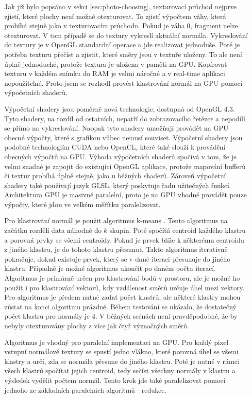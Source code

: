 \documentclass[11pt,twoside,a4paper]{book}
\begin{document}
Jak již bylo popsáno v sekci \ref{sec:photo-choosing}, texturovací průchod nejprve zjistí, které plochy není možné otexturovat. To zjistí výpočtem váhy, která probíhá stejně jako v texturovacím průchodu. Pokud je váha 0, fragment nelze otexturovat. V tom případě se do textury vykreslí aktuální normála. Vykreslování do textury je v OpenGL standardní operace a jde realizovat jednoduše. Poté je potřeba texturu přečíst a zjistit, které směry jsou v textuře uloženy. To ale není úplně jednoduché, protože textura je uložena v paměti na GPU. Kopírovat texturu v každém snímku do RAM je velmi náročné a v real-time aplikaci nepoužitelné. Proto jsem se rozhodl provést klastrování normál na GPU pomocí výpočetních shaderů.

Výpočetní shadery jsou poměrně nová technologie, dostupná od OpenGL 4.3. Tyto shadery, na rozdíl od ostatních, nepatří do zobrazovacího řetězce a nepodílí se přímo na vykreslování. Naopak tyto shadery umožňují provádět na GPU obecné výpočty, které s grafikou vůbec nemusí souviset. Výpočetní shadery jsou podobné technologiím CUDA nebo OpenCL, které také slouží k provádění obecných výpočtů na GPU. Výhoda výpočetních shaderů spočívá v tom, že je velmi snadné je zapojit do existující OpenGL aplikace, protože mapování bufferů či textur probíhá úplně stejně, jako u běžných shaderů. Zároveň výpočetní shadery také používají jazyk GLSL, který poskytuje řadu užitečných funkcí.  Architektura GPU je masivně paralelní, proto je na GPU vhodné provádět pouze výpočty, které jdou ve velkém měřítku paralelizovat.  

Pro klastrování normál je použit algoritmus k-means \cite{Lloyd82}. Tento algoritmus na začátku rozdělí data náhodně do $k$ skupin. Poté spočítá centroid každého klastru a porovná prvky se všemi centroidy. Pokud je prvek blíže k některému centroidu z jiného klastru, je do tohoto klastru přesunut. Takto algoritmus iterativně pokračuje, dokud existuje prvek, který se v dané iteraci přesunuje do jiného klastru. Případně je možné algoritmus ukončit po daném počtu iterací. Algoritmus je primárně určen pro klastrování bodů v prostoru, ale je možné ho použít i pro klastrování vektorů, kdy vzdálenost směrů určuje úhel mezi vektory. Pro algoritmus je předem nutné zadat počet klastrů, ale některé klastry mohou zůstat na konci algoritmu prázdné. Během testování se ukázalo, že dostatečný počet klastrů pro normály je 4. V běžných scénách není pravděpodobné, že by nebyly otexturovány plochy z více jak čtyř význačných směrů.

Algoritmus je vhodný pro paralelní implementaci na GPU. Pro každý pixel vstupní normálové textury se spustí jedno vlákno, které porovná úhel se všemi klastry a určí, zda se normála přesune do jiného klastru. Poté je nutné v rámci všech klastrů spočítat jejich centroid, tedy sečíst všechny normály v klastru a výsledek vydělit počtem normál. Tento krok jde také paralelizovat pomocí jednoho ze základních paralelních algoritmů - redukce.
\end{document}
